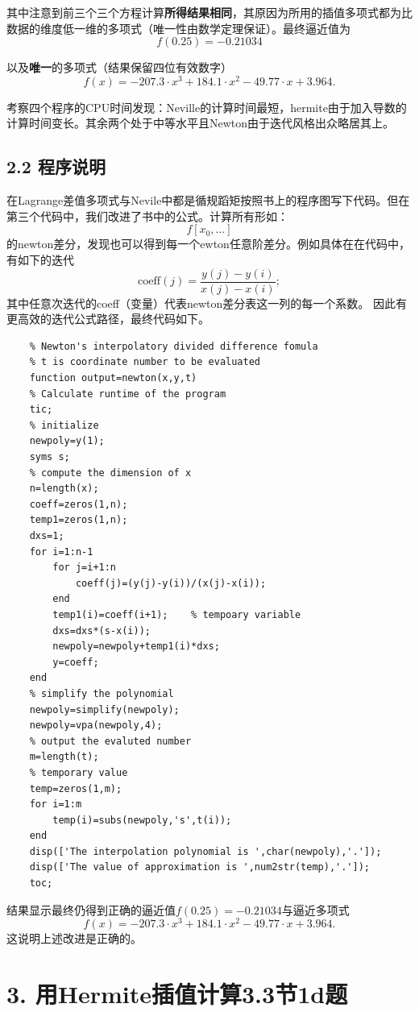 \documentclass{article}
\begin{document}
    其中注意到前三个三个方程计算\textbf{所得结果相同}，其原因为所用的插值多项式都为比数据的维度低一维的多项式（唯一性由数学定理保证）。最终逼近值为
    $$f(0.25)=-0.21034
    $$

    以及\textbf{唯一}的多项式（结果保留四位有效数字）
    $$f(x)=-207.3\cdot x^3+184.1\cdot x^2-49.77\cdot x+3.964.
    $$

    考察四个程序的CPU时间发现：Neville的计算时间最短，hermite由于加入导数的计算时间变长。其余两个处于中等水平且Newton由于迭代风格出众略居其上。

\subsection{2.2 程序说明}
    在Lagrange差值多项式与Nevile中都是循规蹈矩按照书上的程序图写下代码。但在第三个代码中，我们改进了书中的公式。计算所有形如：
    $$ f[x_{0},\ldots]
    $$
    的newton差分，发现也可以得到每一个ewton任意阶差分。例如具体在在代码中，有如下的迭代
    $$\text{coeff}(j)=\frac{y(j)-y(i)}{x(j)-x(i)};
    $$
    其中任意次迭代的coeff（变量）代表newton差分表这一列的每一个系数。
    因此有更高效的迭代公式路径，最终代码如下。
    \begin{lstlisting}
    % Newton's interpolatory divided difference fomula
    % t is coordinate number to be evaluated
    function output=newton(x,y,t)
    % Calculate runtime of the program
    tic;
    % initialize
    newpoly=y(1);
    syms s;
    % compute the dimension of x
    n=length(x);
    coeff=zeros(1,n);
    temp1=zeros(1,n);
    dxs=1;
    for i=1:n-1
        for j=i+1:n
            coeff(j)=(y(j)-y(i))/(x(j)-x(i));
        end
        temp1(i)=coeff(i+1);    % tempoary variable
        dxs=dxs*(s-x(i));
        newpoly=newpoly+temp1(i)*dxs;
        y=coeff;
    end
    % simplify the polynomial
    newpoly=simplify(newpoly);
    newpoly=vpa(newpoly,4);
    % output the evaluted number
    m=length(t);
    % temporary value
    temp=zeros(1,m);
    for i=1:m
        temp(i)=subs(newpoly,'s',t(i));
    end
    disp(['The interpolation polynomial is ',char(newpoly),'.']);
    disp(['The value of approximation is ',num2str(temp),'.']);
    toc;
    \end{lstlisting}
    结果显示最终仍得到正确的逼近值$f(0.25)=-0.21034
    $与逼近多项式
    $$f(x)=-207.3\cdot x^3+184.1\cdot x^2-49.77\cdot x+3.964.
    $$
    这说明上述改进是正确的。

\newpage

\section{3. 用Hermite插值计算3.3节1d题}
\end{document}
